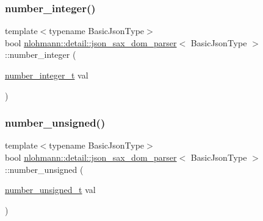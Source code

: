 \mbox{\label{classnlohmann_1_1detail_1_1json__sax__dom__parser_aff77f861ba336df48c9786a993941397}} 
\subsubsection{\texorpdfstring{number\_integer()}{number\_integer()}}
{\footnotesize\ttfamily template$<$typename Basic\+Json\+Type$>$ \\
bool \mbox{\hyperlink{classnlohmann_1_1detail_1_1json__sax__dom__parser}{nlohmann\+::detail\+::json\+\_\+sax\+\_\+dom\+\_\+parser}}$<$ Basic\+Json\+Type $>$\+::number\+\_\+integer (\begin{DoxyParamCaption}\item[{\mbox{\hyperlink{classnlohmann_1_1detail_1_1json__sax__dom__parser_a3d5cd67d179aa7422ce90e54984a441e}{number\+\_\+integer\+\_\+t}}}]{val }\end{DoxyParamCaption})\hspace{0.3cm}{\ttfamily [inline]}}

\mbox{\label{classnlohmann_1_1detail_1_1json__sax__dom__parser_a2b4ff5146ed46993527e4a67d99c1355}} 
\subsubsection{\texorpdfstring{number\_unsigned()}{number\_unsigned()}}
{\footnotesize\ttfamily template$<$typename Basic\+Json\+Type$>$ \\
bool \mbox{\hyperlink{classnlohmann_1_1detail_1_1json__sax__dom__parser}{nlohmann\+::detail\+::json\+\_\+sax\+\_\+dom\+\_\+parser}}$<$ Basic\+Json\+Type $>$\+::number\+\_\+unsigned (\begin{DoxyParamCaption}\item[{\mbox{\hyperlink{classnlohmann_1_1detail_1_1json__sax__dom__parser_a90f19b272530a479db81db11be2ea15c}{number\+\_\+unsigned\+\_\+t}}}]{val }\end{DoxyParamCaption})\hspace{0.3cm}{\ttfamily [inline]}}

